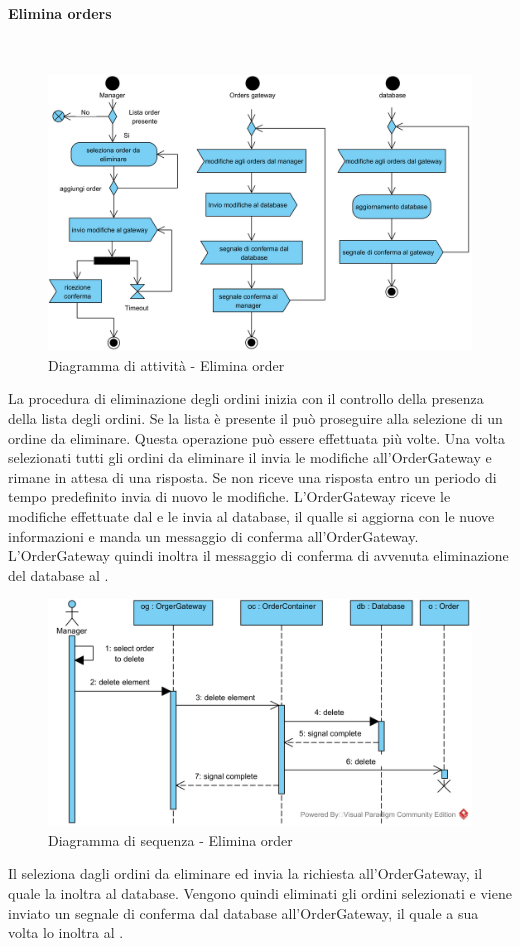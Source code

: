 \paragraph{Elimina orders}\mbox{}\\
\nopagebreak
\begin{figure}[H]
	\centering
	\includegraphics[width=14cm]{diagrammi_img/attivita/manager_order_remove.png}
	\caption{Diagramma di attività - Elimina order}
\end{figure}
La procedura di eliminazione degli ordini inizia con il controllo della presenza della lista degli ordini. Se la lista è presente il \Manager{} può proseguire alla selezione di un ordine da eliminare. Questa operazione può essere effettuata più volte. Una volta selezionati tutti gli ordini da eliminare il \Manager{} invia le modifiche all'OrderGateway e rimane in attesa di una risposta. Se non riceve una risposta entro un periodo di tempo predefinito invia di nuovo le modifiche. L'OrderGateway riceve le modifiche effettuate dal \Manager{} e le invia al database, il qualle si aggiorna con le nuove informazioni e manda un messaggio di conferma all'OrderGateway. L'OrderGateway quindi inoltra il messaggio di conferma di avvenuta eliminazione del database al \Manager{}.

\begin{figure}[H]
	\centering
	\includegraphics[width=14cm]{diagrammi_img/sequenza/direttore_elimina_orders.png}
	\caption{Diagramma di sequenza - Elimina order}
\end{figure}
Il \Manager{} seleziona dagli ordini da eliminare ed invia la richiesta all'Order\-Gateway, il quale la inoltra al database. Vengono quindi eliminati gli ordini selezionati e viene inviato un segnale di conferma dal database all'Order\-Gateway, il quale a sua volta lo inoltra al \Manager{}.
